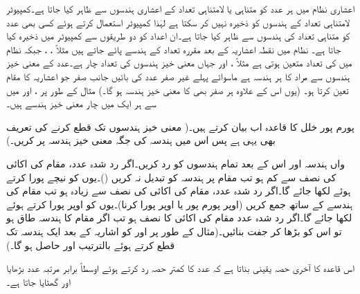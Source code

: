 اعشاری نظام میں ہر عدد کو متناہی یا لامتناہی تعداد کے اعشاری ہندسوں سے ظاہر کیا جاتا ہے۔کمپیوٹر لامتناہی تعداد کے ہندسوں کو ذخیرہ نہیں کر سکتا ہے لہٰذا کمپیوٹر استعمال کرتے ہوئے کسی بھی عدد کو متناہی تعداد کی ہندسوں سے ظاہر کیا جاتا ہے۔ان اعداد کو دو طریقوں سے کمپیوٹر میں  ذخیرہ کیا جاتا ہے۔  نظام میں نقطہ اعشاریہ کے بعد مقررہ تعداد کے ہندسے  پائے جاتے ہیں مثلاً ، ،  جبکہ  نظام میں  کی تعداد متعین ہوتی ہے مثلاً ،  اور  جہاں معنی خیز ہندسوں کی تعداد چار ہے۔عدد  کے معنی خیز ہندسوں سے مراد  کا ہر ہندسہ ہے ماسوائے پہلے غیر صفر عدد کی بائیں جانب صفر جو اعشاریہ کا مقام تعین کرتا ہو۔ (یوں اس کے علاوہ ہر صفر بھی  کا معنی خیز ہندسہ ہو گا۔) مثال کے طور پر ،  اور  میں سے ہر ایک میں چار معنی خیز ہندسے ہیں۔

پورم پور خلل کا قاعدہ اب بیان کرتے ہیں۔( معنی خیز ہندسوں تک قطع کرنے کی تعریف بھی یہی ہے پس اس میں ہندسہ کی جگہ معنی خیز ہندسہ پر کریں۔)

 واں ہندسہ اور اس کے بعد تمام ہندسوں کو رد کریں۔اگر رد شدہ عدد، مقام  کی اکائی کی نصف سے کم ہو تب مقام  پر ہندسہ کو تبدیل نہ کریں ()۔یوں  کو نیچے پورا کرتے ہوئے  لکھا جائے گا۔اگر رد شدہ عدد، مقام  کی اکائی کی نصف سے زیادہ ہو تب مقام  کی ہندسے کے ساتھ  جمع کریں (اوپر پورم پور یا اوپر پورا کرنا)۔یوں  کو اوپر پورا کرتے ہوئے  لکھا جائے گا۔اگر رد شدہ عدد مقام  کی اکائی کا نصف ہو تب اگر مقام  کا ہندسہ طاق ہو تو اس کو بڑھا کر جفت بنائیں۔(مثال کے طور پر  اور  کو اشاریہ کے بعد ایک ہندسہ تک قطع کرتے ہوئے بالترتیب  اور  حاصل ہو گا۔)

اس قاعدہ کا آخری حصہ یقینی بناتا ہے کہ  عدد کا کمتر حصہ رد کرتے ہوئے اوسطاً برابر مرتبہ عدد بڑھایا اور گھٹایا جاتا ہے۔ 

